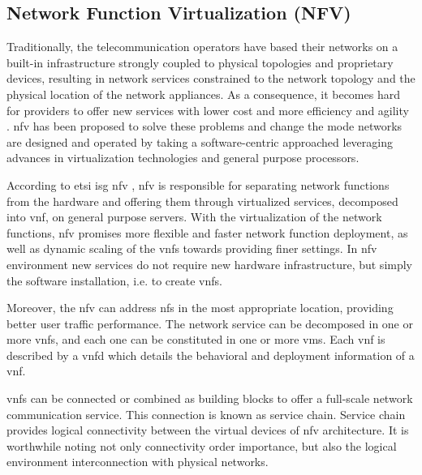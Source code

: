 \subsection{Network Function Virtualization (NFV)}

Traditionally, the telecommunication operators have based their networks on a built-in infrastructure strongly coupled to physical topologies and proprietary devices, resulting in network services constrained to the network topology and the physical location of the network appliances. As a consequence, it becomes hard for providers to offer new services with lower cost and more efficiency and agility \cite{Mijumbi2016NetworkChallenges}. \acrlong{nfv} has been proposed to solve these problems \cite{ETSI2012NetworkAction} and change the mode networks are designed and operated by taking a software-centric approached leveraging advances in virtualization technologies and general purpose processors.

According to \gls{etsi} \gls{isg} \gls{nfv} \cite{ETSIIndustrySpecificationGroupISGNFV2014NetworkNFV},  \acrlong{nfv} is responsible for separating network functions from the hardware and offering them through virtualized services, decomposed into \gls{vnf}, on general purpose servers. With the virtualization of the network functions, \gls{nfv} promises more flexible and faster network function deployment, as well as dynamic scaling of the \glspl{vnf} towards providing finer settings. In \gls{nfv} environment new services do not require new hardware infrastructure, but simply the software installation, i.e. to create \glspl{vnf}.

Moreover, the \gls{nfv} can address \glspl{nf} in the most appropriate location, providing better user traffic performance. The network service can be decomposed in one or more \glspl{vnf}, and each one can be constituted in one or more \glspl{vm}. Each \gls{vnf} is described by a \gls{vnfd} which details the behavioral and deployment information of a \gls{vnf}.

\glspl{vnf} can be connected or combined as building blocks to offer a full-scale network communication service. This connection is known as service chain. Service chain provides logical connectivity between the virtual devices of \gls{nfv} architecture. It is worthwhile noting not only connectivity order importance, but also the logical environment interconnection with physical networks. 

